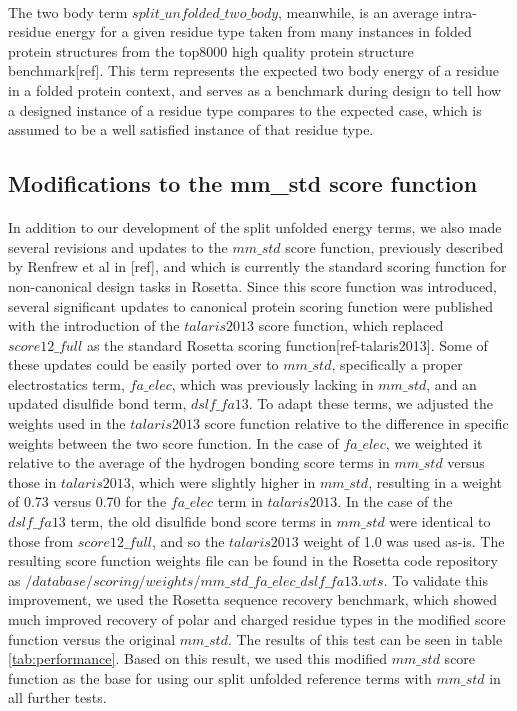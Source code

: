\paragraph{}
The two body term $split\_unfolded\_two\_body$, meanwhile, is an average intra-residue energy for a given residue type taken from many instances in folded protein structures from the top8000 high quality protein structure benchmark[ref].
This term represents the expected two body energy of a residue in a folded protein context, and serves as a benchmark during design to tell how a designed instance of a residue type compares to the expected case, which is assumed to be a well satisfied instance of that residue type. 


\subsection{Modifications to the mm\_std score function}
\paragraph{}
In addition to our development of the split unfolded energy terms, we also made several revisions and updates to the $mm\_std$ score function, previously described by Renfrew et al in [ref], and which is currently the standard scoring function for non-canonical design tasks in Rosetta.
Since this score function was introduced, several significant updates to canonical protein scoring function were published with the introduction of the $talaris2013$ score function, which replaced $score12\_full$ as the standard Rosetta scoring function[ref-talaris2013].
Some of these updates could be easily ported over to $mm\_std$, specifically a proper electrostatics term, $fa\_elec$, which was previously lacking in $mm\_std$, and an updated disulfide bond term, $dslf\_fa13$.
To adapt these terms, we adjusted the weights used in the $talaris2013$ score function relative to the difference in specific weights between the two score function.
In the case of $fa\_elec$, we weighted it relative to the average of the hydrogen bonding score terms in $mm\_std$ versus those in $talaris2013$, which were slightly higher in $mm\_std$, resulting in a weight of 0.73 versus 0.70 for the $fa\_elec$ term in $talaris2013$.
In the case of the $dslf\_fa13$ term, the old disulfide bond score terms in $mm\_std$ were identical to those from $score12\_full$, and so the $talaris2013$ weight of 1.0 was used as-is.
The resulting score function weights file can be found in the Rosetta code repository as $/database/scoring/weights/mm\_std\_fa\_elec\_dslf\_fa13.wts$.
To validate this improvement, we used the Rosetta sequence recovery benchmark, which showed much improved recovery of polar and charged residue types in the modified score function versus the original $mm\_std$.
The results of this test can be seen in table \ref{tab:performance}.
Based on this result, we used this modified $mm\_std$ score function as the base for using our split unfolded reference terms with $mm\_std$ in all further tests.


